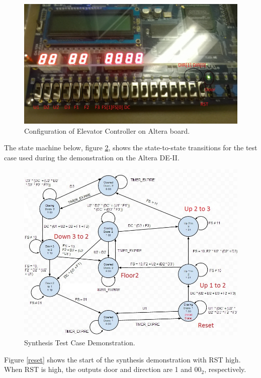 \documentclass[journal]{IEEEtran}
\begin{document}
\begin{figure}[h]
\centering
\includegraphics[width=0.9\linewidth]{Altera_Config.jpg}
\caption{Configuration of Elevator Controller on Altera board.}
\label{altera_configuration}
\end{figure}

The state machine below, figure \ref{synth_state_machine}, shows the state-to-state transitions for the test case used during the demonstration on the Altera DE-II. 

\begin{figure}[h]
\centering
\includegraphics[width=0.9\linewidth]{Synth_State_Machine.jpg}
\caption{Synthesis Test Case Demonstration.}
\label{synth_state_machine}
\end{figure}

Figure \ref{reset} shows the start of the synthesis demonstration with RST high. When RST is high, the outputs door and direction are 1 and 00$_{2}$, respectively. 
\end{document}
